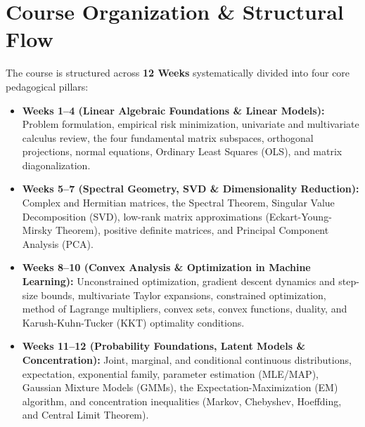 \documentclass[11pt,a4paper,oneside]{book}
\begin{document}
\section*{Course Organization \& Structural Flow}
The course is structured across \textbf{12 Weeks} systematically divided into four core pedagogical pillars:
\begin{itemize}
    \item \textbf{Weeks 1--4 (Linear Algebraic Foundations \& Linear Models):} Problem formulation, empirical risk minimization, univariate and multivariate calculus review, the four fundamental matrix subspaces, orthogonal projections, normal equations, Ordinary Least Squares (OLS), and matrix diagonalization.
    \item \textbf{Weeks 5--7 (Spectral Geometry, SVD \& Dimensionality Reduction):} Complex and Hermitian matrices, the Spectral Theorem, Singular Value Decomposition (SVD), low-rank matrix approximations (Eckart-Young-Mirsky Theorem), positive definite matrices, and Principal Component Analysis (PCA).
    \item \textbf{Weeks 8--10 (Convex Analysis \& Optimization in Machine Learning):} Unconstrained optimization, gradient descent dynamics and step-size bounds, multivariate Taylor expansions, constrained optimization, method of Lagrange multipliers, convex sets, convex functions, duality, and Karush-Kuhn-Tucker (KKT) optimality conditions.
    \item \textbf{Weeks 11--12 (Probability Foundations, Latent Models \& Concentration):} Joint, marginal, and conditional continuous distributions, expectation, exponential family, parameter estimation (MLE/MAP), Gaussian Mixture Models (GMMs), the Expectation-Maximization (EM) algorithm, and concentration inequalities (Markov, Chebyshev, Hoeffding, and Central Limit Theorem).
\end{itemize}
\end{document}
